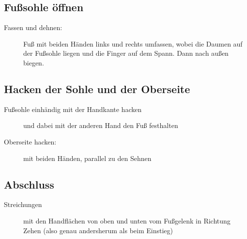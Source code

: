 \subsection{Fußsohle öffnen}
\begin{description}
  \item[Fassen und dehnen:] Fuß mit beiden Händen links und rechts umfassen, wobei die Daumen auf der Fußsohle liegen und die Finger auf dem Spann. Dann nach außen biegen.
\end{description}


\subsection{Hacken der Sohle und der Oberseite}
\begin{description}
  \item[Fußsohle einhändig mit der Handkante hacken] und dabei mit der anderen Hand den Fuß festhalten
  \item[Oberseite hacken:] mit beiden Händen, parallel zu den Sehnen
\end{description}

\subsection{Abschluss}
\begin{description}
  \item[Streichungen] mit den Handflächen von oben und unten vom Fußgelenk in Richtung Zehen (also genau andersherum als beim Einstieg)
\end{description}
